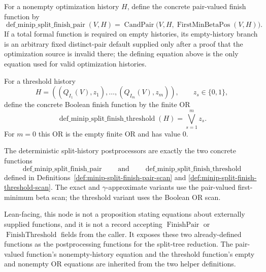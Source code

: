 \begin{definition}
  \label{def:minip-split-finish-pair-scan}
  For a nonempty optimization history $H$, define the concrete pair-valued
  finish function by
  \[
    \operatorname{def\_minip\_split\_finish\_pair}(V,H)
      =
    \operatorname{CandPair}
      \bigl(V,H,\operatorname{FirstMinBetaPos}(V,H)\bigr).
  \]
  If a total formal function is required on empty histories, its empty-history
  branch is an arbitrary fixed distinct-pair default supplied only after a
  proof that the optimization source is invalid there; the defining equation
  above is the only equation used for valid optimization histories.
\end{definition}

\begin{definition}
  \label{def:minip-split-finish-threshold-scan}
  For a threshold history
  \[
    H=((Q_{I_1}(V),z_1),\ldots,(Q_{I_m}(V),z_m)),
    \qquad z_s\in\{0,1\},
  \]
  define the concrete Boolean finish function by the finite OR
  \[
    \operatorname{def\_minip\_split\_finish\_threshold}(H)
      =
    \bigvee_{s=1}^{m} z_s.
  \]
  For $m=0$ this OR is the empty finite OR and has value $0$.
\end{definition}

\begin{definition}
  \label{def:minip-split-history-postprocessing}
  The deterministic split-history postprocessors are exactly the two concrete
  functions
  \[
    \operatorname{def\_minip\_split\_finish\_pair}
    \qquad\text{and}\qquad
    \operatorname{def\_minip\_split\_finish\_threshold}
  \]
  defined in Definitions~\ref{def:minip-split-finish-pair-scan} and
  \ref{def:minip-split-finish-threshold-scan}.  The exact and
  $\gamma$-approximate variants use the pair-valued first-minimum beta scan;
  the threshold variant uses the Boolean OR scan.

  Lean-facing, this node is not a proposition stating equations about
  externally supplied functions, and it is not a record accepting
  $\operatorname{FinishPair}$ or $\operatorname{FinishThreshold}$ fields from
  the caller.  It exposes these two already-defined functions as the
  postprocessing functions for the split-tree reduction.  The pair-valued
  function's nonempty-history equation and the threshold function's empty and
  nonempty OR equations are inherited from the two helper definitions.
\end{definition}

